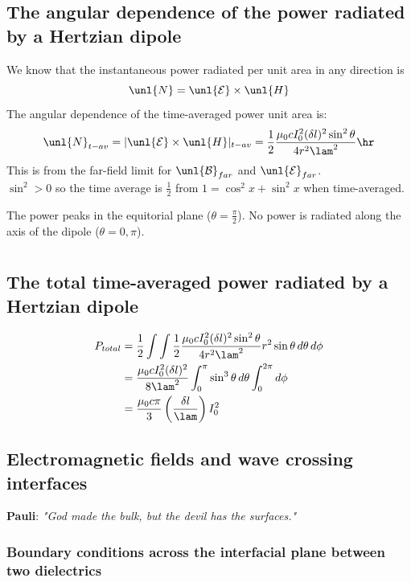 \documentclass[a4paper, 11pt, normalem]{report}
\renewcommand\E{\mathcal{E}}
\newcommand\uE{\unl{\E}}
\renewcommand\B{\mathcal{B}}
\newcommand\uB{\unl{\B}}
\begin{document}
\section{The angular dependence of the power radiated by a Hertzian dipole}
We know that the instantaneous power radiated per unit area in any direction is
\begin{equation}
	\unl{N} = \uE\times\unl{H}
\end{equation}
The angular dependence of the time-averaged power unit area is:
\begin{equation}
	\unl{N}_{t-av} = |\uE\times\unl{H}|_{t-av} = \frac{1}{2}\frac{\mu_0cI_0^2(\delta l)^2\sin^2\theta}{4r^2\lam^2}\hr
\end{equation}
This is from the far-field limit for $\uB_{far}$ and $\uE_{far}$. \\
$\sin^2 > 0$ so the time average is $\frac{1}{2}$ from $1 = \cos^2x + \sin^2x$ when time-averaged.

The power peaks in the equitorial plane ($\theta = \frac{\pi}{2}$).
No power is radiated along the axis of the dipole ($\theta = 0,\pi$).

\chapter{}
\section{The total time-averaged power radiated by a Hertzian dipole}
\begin{align}
	P_{total} &= \frac{1}{2}\int\int \frac{1}{2}\frac{\mu_0cI_0^2(\delta l)^2\sin^2\theta}{4r^2\lam^2}r^2\sin\theta\,d\theta\,d\phi \\
	          &= \frac{\mu_0cI_0^2(\delta l)^2}{8\lam^2}\int_0^\pi \sin^3\theta\,d\theta \int_0^{2\pi} d\phi \\
           	  &= \frac{\mu_0c\pi}{3}\left(\frac{\delta l}{\lam}\right)I_0^2
\end{align}

\section{Electromagnetic fields and wave crossing interfaces}
\textbf{Pauli}: \emph{"God made the bulk, but the devil has the surfaces."}

\subsection{Boundary conditions across the interfacial plane between two dielectrics}
\end{document}
